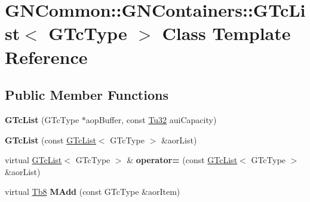 \hypertarget{class_g_n_common_1_1_g_n_containers_1_1_g_tc_list}{}\section{G\+N\+Common\+:\+:G\+N\+Containers\+:\+:G\+Tc\+List$<$ G\+Tc\+Type $>$ Class Template Reference}
\label{class_g_n_common_1_1_g_n_containers_1_1_g_tc_list}
\subsection*{Public Member Functions}
\begin{DoxyCompactItemize}
\item 
\mbox{\label{class_g_n_common_1_1_g_n_containers_1_1_g_tc_list_a4b0299bbadadc6f465d0d4ef28c12307}} 
{\bfseries G\+Tc\+List} (G\+Tc\+Type $\ast$aop\+Buffer, const \mbox{\hyperlink{namespace_g_n_common_a941b527ef318f318aed7903dc832b7e4}{Tu32}} aui\+Capacity)
\item 
\mbox{\label{class_g_n_common_1_1_g_n_containers_1_1_g_tc_list_a36e56c7b6659a448750f902a0026acc0}} 
{\bfseries G\+Tc\+List} (const \mbox{\hyperlink{class_g_n_common_1_1_g_n_containers_1_1_g_tc_list}{G\+Tc\+List}}$<$ G\+Tc\+Type $>$ \&aor\+List)
\item 
\mbox{\label{class_g_n_common_1_1_g_n_containers_1_1_g_tc_list_a025e8a62abb5e84151e21416c407973b}} 
virtual \mbox{\hyperlink{class_g_n_common_1_1_g_n_containers_1_1_g_tc_list}{G\+Tc\+List}}$<$ G\+Tc\+Type $>$ \& {\bfseries operator=} (const \mbox{\hyperlink{class_g_n_common_1_1_g_n_containers_1_1_g_tc_list}{G\+Tc\+List}}$<$ G\+Tc\+Type $>$ \&aor\+List)
\item 
\mbox{\label{class_g_n_common_1_1_g_n_containers_1_1_g_tc_list_a2734cc013b1e9016c8563539af6bb038}} 
virtual \mbox{\hyperlink{namespace_g_n_common_a8115dc7ed53b6e5b52e6bfde1632ea74}{Tb8}} {\bfseries M\+Add} (const G\+Tc\+Type \&aor\+Item)
\item 
\mbox{\label{class_g_n_common_1_1_g_n_containers_1_1_g_tc_list_a37746ffc76546337b39253004817a037}} 

\end{DoxyCompactItemize}

